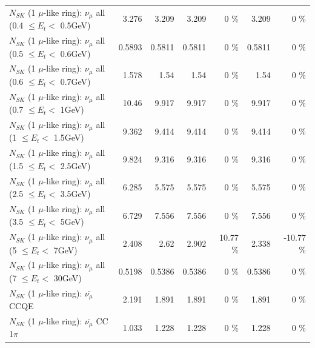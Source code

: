\begin{table}
\begin{tabular}{| l | r | r | r  r | r  r |}
       $N_{SK}$ (1 $\mu$-like ring): $\nu_{\mu}$ all (0.4 $\leq E_{t} <$ 0.5GeV) &           3.276 &           3.209 &           3.209 &        0 \%  &           3.209 &        0 \%  \\ 
       $N_{SK}$ (1 $\mu$-like ring): $\nu_{\mu}$ all (0.5 $\leq E_{t} <$ 0.6GeV) &          0.5893 &          0.5811 &          0.5811 &        0 \%  &          0.5811 &        0 \%  \\ 
       $N_{SK}$ (1 $\mu$-like ring): $\nu_{\mu}$ all (0.6 $\leq E_{t} <$ 0.7GeV) &           1.578 &            1.54 &            1.54 &        0 \%  &            1.54 &        0 \%  \\ 
         $N_{SK}$ (1 $\mu$-like ring): $\nu_{\mu}$ all (0.7 $\leq E_{t} <$ 1GeV) &           10.46 &           9.917 &           9.917 &        0 \%  &           9.917 &        0 \%  \\ 
         $N_{SK}$ (1 $\mu$-like ring): $\nu_{\mu}$ all (1 $\leq E_{t} <$ 1.5GeV) &           9.362 &           9.414 &           9.414 &        0 \%  &           9.414 &        0 \%  \\ 
       $N_{SK}$ (1 $\mu$-like ring): $\nu_{\mu}$ all (1.5 $\leq E_{t} <$ 2.5GeV) &           9.824 &           9.316 &           9.316 &        0 \%  &           9.316 &        0 \%  \\ 
       $N_{SK}$ (1 $\mu$-like ring): $\nu_{\mu}$ all (2.5 $\leq E_{t} <$ 3.5GeV) &           6.285 &           5.575 &           5.575 &        0 \%  &           5.575 &        0 \%  \\ 
         $N_{SK}$ (1 $\mu$-like ring): $\nu_{\mu}$ all (3.5 $\leq E_{t} <$ 5GeV) &           6.729 &           7.556 &           7.556 &        0 \%  &           7.556 &        0 \%  \\ 
           $N_{SK}$ (1 $\mu$-like ring): $\nu_{\mu}$ all (5 $\leq E_{t} <$ 7GeV) &           2.408 &            2.62 &           2.902 &    10.77 \%  &           2.338 &   -10.77 \%  \\ 
          $N_{SK}$ (1 $\mu$-like ring): $\nu_{\mu}$ all (7 $\leq E_{t} <$ 30GeV) &          0.5198 &          0.5386 &          0.5386 &        0 \%  &          0.5386 &        0 \%  \\ 
\hline
\hline
\hline
                              $N_{SK}$ (1 $\mu$-like ring): $\bar{\nu_\mu}$ CCQE &           2.191 &           1.891 &           1.891 &        0 \%  &           1.891 &        0 \%  \\ 
                         $N_{SK}$ (1 $\mu$-like ring): $\bar{\nu_\mu}$ CC 1$\pi$ &           1.033 &           1.228 &           1.228 &        0 \%  &           1.228 &        0 \%  \\ 

\end{tabular}
\end{table}
